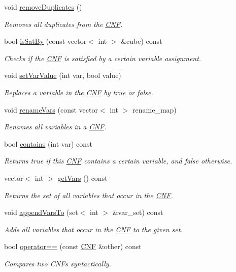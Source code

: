 \begin{DoxyCompactItemize}
void \hyperlink{classCNF_a08cf05fc87ad59d65b0b03d8d3f61029}{remove\-Duplicates} ()
\begin{DoxyCompactList}\small\item\em Removes all duplicates from the \hyperlink{classCNF}{C\-N\-F}. \end{DoxyCompactList}\item 
bool \hyperlink{classCNF_ac0fc121fe92bc190aeeaf351703fe111}{is\-Sat\-By} (const vector$<$ int $>$ \&cube) const 
\begin{DoxyCompactList}\small\item\em Checks if the \hyperlink{classCNF}{C\-N\-F} is satisfied by a certain variable assignment. \end{DoxyCompactList}\item 
void \hyperlink{classCNF_a6fe7640aa2a65579cf8364092f26c126}{set\-Var\-Value} (int var, bool value)
\begin{DoxyCompactList}\small\item\em Replaces a variable in the \hyperlink{classCNF}{C\-N\-F} by true or false. \end{DoxyCompactList}\item 
void \hyperlink{classCNF_ac34e02c39a762ad696449a8c75d4e115}{rename\-Vars} (const vector$<$ int $>$ rename\-\_\-map)
\begin{DoxyCompactList}\small\item\em Renames all variables in a \hyperlink{classCNF}{C\-N\-F}. \end{DoxyCompactList}\item 
bool \hyperlink{classCNF_aa450a94a6161936d1a3cdffd083a0e42}{contains} (int var) const 
\begin{DoxyCompactList}\small\item\em Returns true if this \hyperlink{classCNF}{C\-N\-F} contains a certain variable, and false otherwise. \end{DoxyCompactList}\item 
vector$<$ int $>$ \hyperlink{classCNF_a4847969cea924a74642e3d914135d8da}{get\-Vars} () const 
\begin{DoxyCompactList}\small\item\em Returns the set of all variables that occur in the \hyperlink{classCNF}{C\-N\-F}. \end{DoxyCompactList}\item 
void \hyperlink{classCNF_a8a54b640d4fbb1da74979fc07536d4e9}{append\-Vars\-To} (set$<$ int $>$ \&var\-\_\-set) const 
\begin{DoxyCompactList}\small\item\em Adds all variables that occur in the \hyperlink{classCNF}{C\-N\-F} to the given set. \end{DoxyCompactList}\item 
bool \hyperlink{classCNF_a5ce0741b551948faff1d3365871b2218}{operator==} (const \hyperlink{classCNF}{C\-N\-F} \&other) const 
\begin{DoxyCompactList}\small\item\em Compares two C\-N\-Fs syntactically. \end{DoxyCompactList}\end{DoxyCompactItemize}
